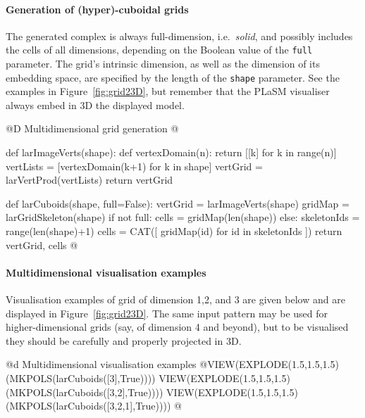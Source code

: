\documentclass[11pt,oneside]{article}	%
\begin{document}
\paragraph{Generation of (hyper)-cuboidal grids}

The generated complex is always full-dimension, i.e.~\emph{solid}, and possibly includes the cells of all dimensions, depending on the Boolean value of the \texttt{full} parameter.
The grid's intrinsic dimension, as well as the dimension of its embedding space, are specified by the length of the \texttt{shape} parameter. See the examples in Figure~\ref{fig:grid23D}, but remember that the PLaSM visualiser always embed in 3D the displayed model. 

@D Multidimensional grid generation
@{def larImageVerts(shape):
	def vertexDomain(n): 
		return [[k] for k in range(n)]
	vertLists = [vertexDomain(k+1) for k in shape]
	vertGrid = larVertProd(vertLists)
	return vertGrid

def larCuboids(shape, full=False):
	vertGrid = larImageVerts(shape)
	gridMap = larGridSkeleton(shape)
	if not full: 
		cells = gridMap(len(shape))
	else:
		skeletonIds = range(len(shape)+1)
		cells = CAT([ gridMap(id) for id in skeletonIds ])
	return vertGrid, cells
@}

\paragraph{Multidimensional visualisation examples}
Visualisation examples of grid of dimension 1,2, and 3 are given below and are displayed  in Figure~\ref{fig:grid23D}. The same input pattern may be used for higher-dimensional grids (say, of dimension 4 and beyond), but to be visualised they should be carefully and properly projected in 3D.

@d Multidimensional visualisation examples
@{VIEW(EXPLODE(1.5,1.5,1.5)(MKPOLS(larCuboids([3],True))))
VIEW(EXPLODE(1.5,1.5,1.5)(MKPOLS(larCuboids([3,2],True))))
VIEW(EXPLODE(1.5,1.5,1.5)(MKPOLS(larCuboids([3,2,1],True))))
@}
\end{document}
